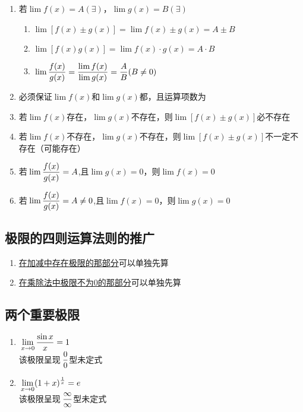 \begin{enumerate}
    \item 若$\lim f(x)=A (\exists)$，$\lim g(x)=B (\exists)$
    \begin{enumerate}
        \item $\lim [f(x)\pm g(x)]=\lim f(x)\pm g(x)=A\pm B$
        \item $\lim [f(x)g(x)]=\lim f(x)\cdot g(x)=A \cdot B$
        \item $\displaystyle\hspace{.2em}\lim \frac{f(x)}{g(x)}=\frac{\lim f(x)}{\lim g(x)}=\frac{A}{B}(B\ne 0)$
    \end{enumerate}
    \item 必须保证$\lim f(x)$和$\lim g(x)$都，且运算项数为
    \item 若$\lim f(x)$存在，$\lim g(x)$不存在，则$\lim [f(x)\pm g(x)]$必不存在
    \item 若$\lim f(x)$不存在，$\lim g(x)$不存在，则$\lim [f(x)\pm g(x)]$不一定不存在（可能存在）
    \item 若$\displaystyle\hspace{.2em}\lim \frac{f(x)}{g(x)}=A$,且$\lim g(x)=0$，则$\lim f(x)=0$ 
    \item 若$\displaystyle\hspace{.2em}\lim \frac{f(x)}{g(x)}=A\ne 0$,且$\lim f(x)=0$，则$\lim g(x)=0$ 
\end{enumerate}

\subsection{极限的四则运算法则的推广}

\begin{enumerate}
    \item \underline{在加减中存在极限的那部分}可以单独先算
    \item \underline{在乘除法中极限不为0的那部分}可以单独先算
\end{enumerate}

\subsection{两个重要极限}

\begin{enumerate}
    \item {$\displaystyle\hspace{.2em}\lim \limits_{x\to 0}\frac{\sin x}{x}=1$\\
    该极限呈现$\displaystyle\hspace{.2em}\frac{0}{0}$型未定式}
    \item {$\displaystyle\hspace{.2em}\lim \limits_{x\to 0}(1+x)^{\frac{1}{x}}=e$\\
    该极限呈现$\displaystyle\hspace{.2em}\frac{\infty}{\infty}$型未定式}
\end{enumerate}

